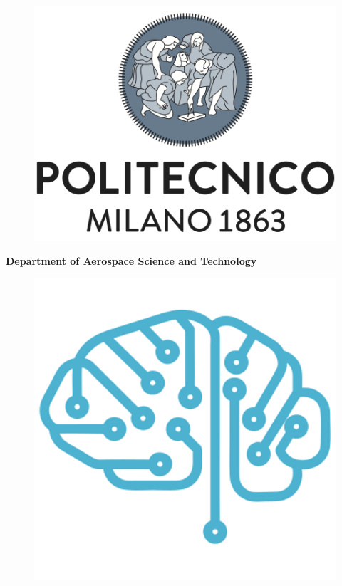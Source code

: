 \documentclass[11pt]{article}
\begin{document}



\begin{titlepage}

\begin{figure} [H]

\centering 

\includegraphics[scale=0.5]{poli.png}

\end{figure}

\begin{center}

\vspace{1cm}

\Large{\textbf{Department of Aerospace Science and Technology}}\\

\begin{figure} [H]

\centering 

\includegraphics[scale=1.3]{index.pdf}


\end{figure}
\end{center}
\end{titlepage}
\end{document}
